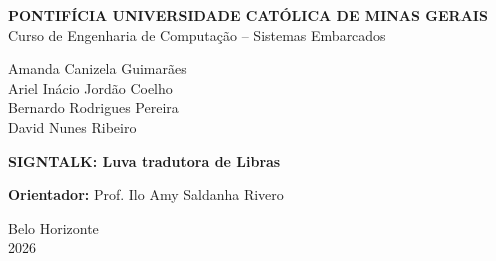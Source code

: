 \documentclass[12pt,a4paper]{article}
\begin{document}
\begin{titlepage}
    \centering
    
    {\large \textbf{PONTIFÍCIA UNIVERSIDADE CATÓLICA DE MINAS GERAIS}} \\
    {\large Curso de Engenharia de Computação – Sistemas Embarcados} \par
    \vspace{4cm}
    
    {\large Amanda Canizela Guimarães \\ Ariel Inácio Jordão Coelho \\ Bernardo Rodrigues Pereira \\ David Nunes Ribeiro} \par
    \vspace{3cm}
    
    {\huge \textbf{SIGNTALK: Luva tradutora de Libras}} \par
    \vspace{3cm}
    
    {\large \textbf{Orientador:} Prof. Ilo Amy Saldanha Rivero} \par
    
    \vfill
    
    {\large Belo Horizonte \\ 2026}
\end{titlepage}
\end{document}
